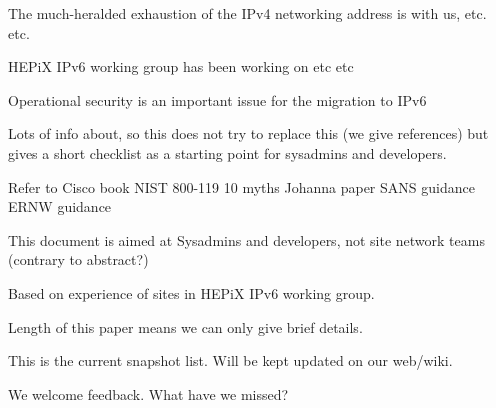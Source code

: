 The much-heralded exhaustion of the IPv4 networking address is with us, etc. etc.

HEPiX IPv6 working group has been working on etc etc

Operational security is an important issue for the migration to IPv6

Lots of info about, so this does not try to replace this (we give references) but gives a short checklist as a starting point for sysadmins and developers.

Refer to 
Cisco book
NIST 800-119
10 myths
Johanna paper
SANS guidance
ERNW guidance

This document is aimed at Sysadmins and developers, not site network teams
(contrary to abstract?)

Based on experience of sites in HEPiX IPv6 working group.

Length of this paper means we can only give brief details.

This is the current snapshot list. Will be kept updated on our web/wiki.

We welcome feedback. What have we missed?
